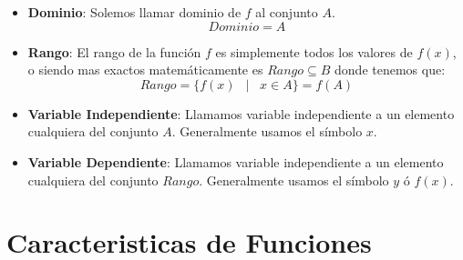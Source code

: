 \documentclass[12pt, fleqn]{report}                             %
\DeclareMathOperator \Space     {\quad}                         %
\DeclareMathOperator \MiniSpace {\;}                            %
\newcommand \Such           {\MiniSpace | \MiniSpace}           %
\theoremstyle{break}                                            %
\begin{document}
                \begin{itemize}
                    \item \textbf{Dominio}:
                        Solemos llamar dominio de $f$ al conjunto $A$.
                        \begin{equation}
                            Dominio = A
                        \end{equation}

                    \item \textbf{Rango}:
                        El rango de la función $f$ es simplemente todos los valores
                        de $f(x)$, o siendo mas exactos matemáticamente es $Rango \subseteq B$
                        donde tenemos que:
                        \begin{equation}
                            Rango = \{ f(x) \Such x \in A \} = f(A)
                        \end{equation}

                    \item \textbf{Variable Independiente}:
                        Llamamos variable independiente a un elemento cualquiera del conjunto $A$.
                        Generalmente usamos el símbolo $x$.

                    \item \textbf{Variable Dependiente}:
                        Llamamos variable independiente a un elemento cualquiera del conjunto $Rango$.
                        Generalmente usamos el símbolo $y$ ó $f(x)$.

                \end{itemize}


                

        \section{Caracteristicas de Funciones}

            



\end{document}
